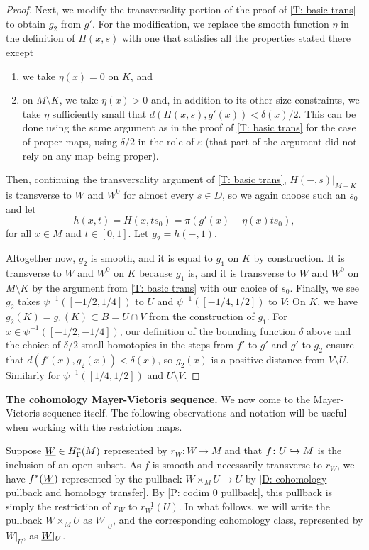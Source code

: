 \begin{proof}
	Next, we modify the transversality portion of the proof of \cref{T: basic trans} to obtain $g_2$ from $g'$.
	For the modification, we replace the smooth function $\eta$ in the definition of $H(x,s)$ with one that satisfies all the properties stated there except
	\begin{enumerate}
		\item we take $\eta(x)=0$ on $K$, and
		\item on $M \setminus K$, we take $\eta(x) > 0$ and, in addition to its other size constraints, we take $\eta$ sufficiently small that $d(H(x,s),g'(x)) < \delta(x)/2$.
		This can be done using the same argument as in the proof of \cref{T: basic trans} for the case of proper maps, using $\delta/2$ in the role of $\varepsilon$ (that part of the argument did not rely on any map being proper).
	\end{enumerate}
	Then, continuing the transversality argument of \cref{T: basic trans}, $H(-,s)|_{M-K}$ is transverse to $W$ and $W^0$ for almost every $s \in D$, so we again choose such an $s_0$ and let $$h(x,t) = H(x, ts_0) = \pi(g'(x) + \eta(x)ts_0),$$ for all $x \in M$ and $t \in [0,1]$.
	Let $g_2 = h(-,1)$.

	Altogether now, $g_2$ is smooth, and it is equal to $g_1$ on $K$ by construction.
	It is transverse to $W$ and $W^0$ on $K$ because $g_1$ is, and it is transverse to $W$ and $W^0$ on $M \setminus K$ by the argument from \cref{T: basic trans} with our choice of $s_0$.
	Finally, we see $g_2$ takes $\psi^{-1}([-1/2,1/4])$ to $U$ and $\psi^{-1}([-1/4,1/2])$ to $V$: On $K$, we have $g_2(K) = g_1(K) \subset B = U \cap V$ from the construction of $g_1$.
	For $x\in \psi^{-1}([-1/2,-1/4])$, our definition of the bounding function $\delta$ above and the choice of $\delta/2$-small homotopies in the steps from $f'$ to $g'$ and $g'$ to $g_2$ ensure that $d(f'(x), g_2(x)) < \delta(x)$, so $g_2(x)$ is a positive distance from $V \setminus U$.
	Similarly for $\psi^{-1}([1/4,1/2])$ and $U \setminus V$.
\end{proof}



\medskip

\noindent\textbf{The cohomology Mayer-Vietoris sequence.} We now come to the Mayer-Vietoris sequence itself.
The following observations and notation will be useful when working with the restriction maps.

Suppose $\underline{W} \in H^*_\Gamma(M)$ represented by $r_W \colon W \to M$ and that $f \colon U \hookrightarrow M$ is the inclusion of an open subset.
As $f$ is smooth and necessarily transverse to $r_W$, we have $f^*(\underline{W})$ represented by the pullback $W \times_M U \to U$ by \cref{D: cohomology pullback and homology transfer}.	By \cref{P: codim 0 pullback}, this pullback is simply the restriction of $r_W$ to $r_W^{-1}(U)$.
In what follows, we will write the pullback $W \times_M U$ as $W|_U$, and the corresponding cohomology class, represented by $W|_U$, as $\underline{W}|_U$.

